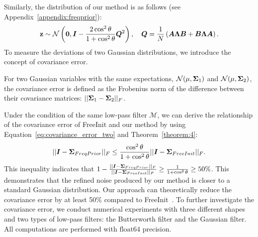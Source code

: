 Similarly, the distribution of our method is as follows (see Appendix~\ref{appendix:freqprior}):
\begin{equation}
    \mathbf{z}\sim\mathcal{N}\left(\mathbf{0}, {\bm{I}} - \frac{2\cos^2\theta}{1+\cos^2\theta}{\bm{Q}}^2\right), \quad {\bm{Q}} = \frac{1}{N}\left({\bm{A}}{\bm{\Lambda}}{\bm{B}}+{\bm{B}}{\bm{\Lambda}}{\bm{A}}\right).
\end{equation}
To measure the deviations of two Gaussian distributions, we introduce the concept of covariance error.
\begin{definition}
\label{definition:1}
    For two Gaussian variables with the same expectations, $\mathcal{N}(\mu,{\bm{\Sigma}}_1)$ and $\mathcal{N}(\mu,{\bm{\Sigma}}_2)$, the covariance error is defined as the Frobenius norm of the difference between their covariance matrices: $||{\bm{\Sigma}}_1-{\bm{\Sigma}}_2||_F$.
\end{definition}

Under the condition of the same low-pass filter $\mathcal{M}$, we can derive the relationship of the covariance error of FreeInit and our method by using Equation~\ref{eq:covariance_error_two} and Theorem~\ref{theorem:4}:
\begin{equation}
    ||{\bm{I}}-\mathbf{\Sigma}_{FreqPrior}||_F 
    \le \frac{\cos^2\theta}{1+\cos^2\theta}||{\bm{I}}-\mathbf{\Sigma}_{FreeInit}||_F. 
\end{equation}
This inequality indicates that $1- \frac{||{\bm{I}}-\mathbf{\Sigma}_{FreqPrior}||_F}{||{\bm{I}}-\mathbf{\Sigma}_{FreeInit}||_F}\ge \frac{1}{1+\cos^2\theta}\ge 50\%$.
This demonstrates that the refined noise produced by our method is closer to a standard Gaussian distribution. 
Our approach can theoretically reduce the covariance error by at least 50\% compared to FreeInit~\citep{wu2023freeinit}. 
To further investigate the covariance error, we conduct numerical experiments with three different shapes and two types of low-pass filters: the Butterworth filter and the Gaussian filter. All computations are performed with $\mathrm{float64}$ precision.

